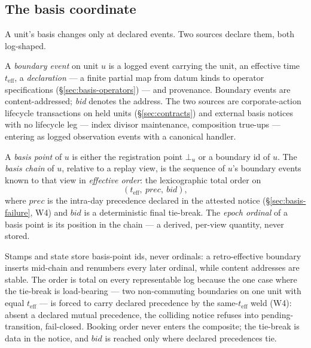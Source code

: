\subsection{The basis coordinate}
\label{sec:basis-coordinate}

A unit's basis changes only at declared events. Two sources declare them, both
log-shaped.

\begin{definition}
\label{def:boundary-event}
A \emph{boundary event} on unit $u$ is a logged event carrying the unit, an effective
time $t_{\mathrm{eff}}$, a \emph{declaration} --- a finite partial map from datum kinds
to operator specifications (\S\ref{sec:basis-operators}) --- and provenance. Boundary
events are content-addressed; \emph{bid} denotes the address. The two sources are
corporate-action lifecycle transactions on held units (\S\ref{sec:contracts}) and
external basis notices with no lifecycle leg --- index divisor maintenance, composition
true-ups --- entering as logged observation events with a canonical handler.
\end{definition}

\begin{definition}
\label{def:basis-point}
A \emph{basis point} of $u$ is either the registration point $\bot_u$ or a boundary id
of $u$. The \emph{basis chain} of $u$, relative to a replay view, is the sequence of
$u$'s boundary events known to that view in \emph{effective order}: the lexicographic
total order on
\[
(t_{\mathrm{eff}},\ \mathit{prec},\ \mathit{bid}),
\]
where $\mathit{prec}$ is the intra-day precedence declared in the attested notice
(\S\ref{sec:basis-failure}, W4) and $\mathit{bid}$ is a deterministic final tie-break.
The \emph{epoch ordinal} of a basis point is its position in the chain --- a derived,
per-view quantity, never stored.
\end{definition}

Stamps and state store basis-point ids, never ordinals: a retro-effective boundary
inserts mid-chain and renumbers every later ordinal, while content addresses are stable.
The order is total on every representable log because the one case where the tie-break
is load-bearing --- two non-commuting boundaries on one unit with equal
$t_{\mathrm{eff}}$ --- is forced to carry declared precedence by the same-$t_{\mathrm{eff}}$
weld (W4): absent a declared mutual precedence, the colliding notice refuses into
pending-transition, fail-closed. Booking order never enters the composite; the tie-break
is data in the notice, and $\mathit{bid}$ is reached only where declared precedences tie.

